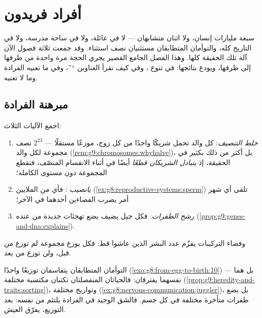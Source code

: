 \chapter{أفراد فريدون}\label{ch:g9:unique-individuals}

سبعة مليارات إنسان، ولا اثنان متشابهان --- لا في عائلة،
ولا في ساحة مدرسة، ولا في التاريخ كله، والتوأمان
المتطابقان مستثنيان نصف استثناء. وقد جمعت ثلاثة فصول
الآن آلة تلك الحقيقة كلها. وهذا الفصل الجامع القصير يجري
الحجة مرة واحدة من طرفها إلى طرفها، ويودع نتائجها: في
تنوع ، وفي كيف نقرأ العناوين ``''، وفي ما
تعنيه الفرادة وما لا تعنيه.

\section{مبرهنة الفرادة}

\begin{proposition}\label{prop:g9:unique-individuals:theorem}
اجمع الآليات الثلاث:
\begin{enumerate}
  \item \emph{خلط التنصيف}:  كل والد تحمل شريكًا
        واحدًا من كل زوج، موزعًا مستقلًا --- $2^{23}$
        نصف مجموعة لكل والد
        (\cref{rem:g9:chromosomes:whyhalve})، بل أكثر من
        ذلك بكثير في الحقيقة، إذ \emph{يتبادل الشريكان
        قطعًا} أيضًا في أثناء الانقسام المنصّف، فتقطع
        المجموعة دون مستوى  الكاملة؛
  \item \emph{يانصيب }: فأي  من الملايين
        (\cref{ex:g8:reproductive-systems:sperm}) تلقى
         أي شهر أمر يضرب الفضاءين أحدهما في الآخر؛
  \item \emph{رشح الطفرات}: فكل جيل يضيف بضع تهجئات
        جديدة من عنده
        (\cref{prop:g9:genes-and-dna:explains}).
\end{enumerate}
وفضاء التركيبات يقزّم عدد البشر الذين عاشوا قط: فكل
 يوزع مجموعة لم توزع من قبل، ولن توزع من بعد.
\end{proposition}
\admitted

\begin{example}\label{ex:g9:unique-individuals:twins}
التوأمان المتطابقان يتقاسمان توزيعًا واحدًا
(\cref{exo:g8:from-egg-to-birth:10}) --- بل هما نفسهما
يفترقان: فالحياتان المنفصلتان تكتبان  مكتسبة مختلفة
(\cref{prop:g9:heredity-and-traits:sorting})، وتواريخ
 مختلفة
(\cref{ex:g8:nervous-communication:juggler})، بل بضع
طفرات متأخرة مختلفة في  كل جسم. فالشق الوحيد في
الفرادة يلتئم من نفسه: بعد التوزيع، يفرّق العيش.
\end{example}

